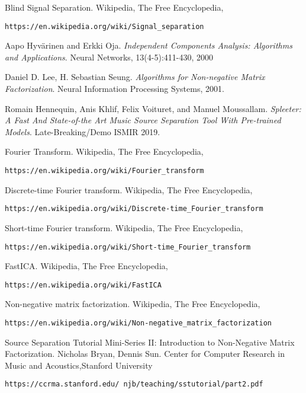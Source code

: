 \documentclass[a4paper,12pt]{article}
\begin{document}
\begin{thebibliography}{9}
Blind Signal Separation. Wikipedia, The Free Encyclopedia,
 
\texttt{https://en.wikipedia.org/wiki/Signal\_separation}

Aapo Hyvärinen and Erkki Oja. \textit{Independent Components Analysis: Algorithms and Applications}. Neural Networks, 13(4-5):411-430, 2000

Daniel D. Lee, H. Sebastian Seung. \textit{Algorithms for Non-negative Matrix Factorization}. Neural Information Processing Systems, 2001.

Romain Hennequin, Anis Khlif, Felix Voituret, and Manuel Moussallam. \textit{Spleeter: A Fast And State-of-the Art Music Source Separation Tool With Pre-trained Models}. Late-Breaking/Demo ISMIR 2019.

Fourier Transform. Wikipedia, The Free Encyclopedia,

\texttt{https://en.wikipedia.org/wiki/Fourier\_transform}

Discrete-time Fourier transform. Wikipedia, The Free Encyclopedia,

\texttt{https://en.wikipedia.org/wiki/Discrete-time\_Fourier\_transform}

Short-time Fourier transform. Wikipedia, The Free Encyclopedia,

\texttt{https://en.wikipedia.org/wiki/Short-time\_Fourier\_transform}

FastICA. Wikipedia, The Free Encyclopedia,

\texttt{https://en.wikipedia.org/wiki/FastICA}

Non-negative matrix factorization. Wikipedia, The Free Encyclopedia,

\texttt{https://en.wikipedia.org/wiki/Non-negative\_matrix\_factorization}

Source Separation Tutorial Mini-Series II: Introduction to Non-Negative Matrix Factorization. Nicholas Bryan, Dennis Sun. Center for Computer Research in Music and Acoustics,Stanford University

\texttt{https://ccrma.stanford.edu/~njb/teaching/sstutorial/part2.pdf}


\end{thebibliography}

	
\end{document}
